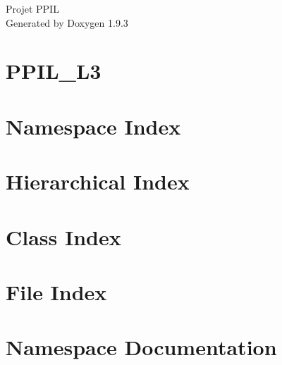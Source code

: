 \documentclass[twoside]{book}
\newcommand{\+}{\discretionary{\mbox{\scriptsize$\hookleftarrow$}}{}{}}
\newcommand{\clearemptydoublepage}{%
    \newpage{\pagestyle{empty}\cleardoublepage}%
  }
\begin{document}
  \raggedbottom
    \hypersetup{pageanchor=false,
                bookmarksnumbered=true,
                pdfencoding=unicode
               }
  \begin{titlepage}
  \vspace*{7cm}
  \begin{center}%
  {\Large Projet PPIL}\\
  \vspace*{1cm}
  {\large Generated by Doxygen 1.9.3}\\
  \end{center}
  \end{titlepage}
  \clearemptydoublepage
  \tableofcontents
  \clearemptydoublepage
  \hypersetup{pageanchor=true}
\chapter{PPIL\+\_\+\+L3}
\label{md__r_e_a_d_m_e}

\chapter{Namespace Index}

\chapter{Hierarchical Index}

\chapter{Class Index}

\chapter{File Index}

\chapter{Namespace Documentation}




\end{document}
